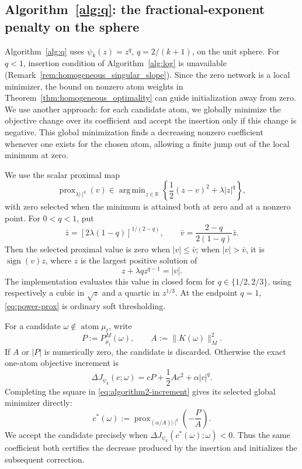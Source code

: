 \documentclass[11pt]{amsart}
\theoremstyle{definition}
\theoremstyle{remark}
\DeclareMathOperator{\atom}{atom}
\DeclareMathOperator{\sign}{sign}
\DeclareMathOperator{\prox}{prox}
\DeclareMathOperator*{\argmin}{arg\,min}
\begin{document}
\subsection{Algorithm~\ref{alg:q}: the fractional-exponent penalty on the sphere}
Algorithm~\ref{alg:q} uses $\psi_k(z)=z^q$, $q=2/(k+1)$, on the
unit sphere. For $q<1$, insertion condition of Algorithm~\ref{alg:log} is unavailable
(Remark~\ref{rem:homogeneous_singular_slope}). Since the zero network is a local
minimizer, the bound on nonzero atom weights in
Theorem~\ref{thm:homogeneous_optimality} can guide initialization away from zero.
We use another approach: for each candidate atom, we globally minimize the
objective change over its coefficient and accept the insertion only if this
change is negative. This global minimization finds a decreasing nonzero
coefficient whenever one exists for the chosen atom, allowing a finite jump
out of the local minimum at zero.

We use the scalar proximal map
\begin{equation}
\label{eq:power-prox}
	\prox_{\lambda|\cdot|^q}(v)
	\in\argmin_{z\in\mathbb R}
	\left\{\frac12(z-v)^2+\lambda|z|^q\right\},
\end{equation}
with zero selected when the minimum is attained both at zero and at a nonzero
point. For $0<q<1$, put
\begin{equation*}
	\bar z=[2\lambda(1-q)]^{1/(2-q)},
	\qquad
	\bar v=\frac{2-q}{2(1-q)}\bar z.
\end{equation*}
Then the selected proximal value is zero when $|v|\le\bar v$; when
$|v|>\bar v$, it is $\sign(v)z$, where $z$ is the largest positive solution
of
\begin{equation*}
	z+\lambda qz^{q-1}=|v|.
\end{equation*}
The implementation evaluates this value in closed form for
$q\in\{1/2,2/3\}$, using respectively a cubic in $\sqrt z$ and a quartic in
$z^{1/3}$. At the endpoint $q=1$, \eqref{eq:power-prox} is ordinary soft
thresholding.

For a candidate $\omega\notin\atom\mu_t$, write
\begin{equation*}
	P:=P^M_{\mu_t}(\omega),
	\qquad A:=\|K(\omega)\|_M^2.
\end{equation*}
If $A$ or $|P|$ is numerically zero, the candidate is discarded. Otherwise the
exact one-atom objective increment is
\begin{equation}
\label{eq:algorithm2-increment}
	\Delta J_{\psi_k}(c;\omega)
	=cP+\frac12Ac^2+\alpha|c|^q.
\end{equation}
Completing the square in \eqref{eq:algorithm2-increment} gives its selected
global minimizer directly:
\begin{equation}
\label{eq:algorithm2-insertion-weight}
	c^*(\omega)
	:=\prox_{(\alpha/A)|\cdot|^q}\!\left(-\frac{P}{A}\right).
\end{equation}
We accept the candidate precisely when
$\Delta J_{\psi_k}(c^*(\omega);\omega)<0$. Thus the same coefficient both
certifies the decrease produced by the insertion and initializes the subsequent
correction.
\end{document}
